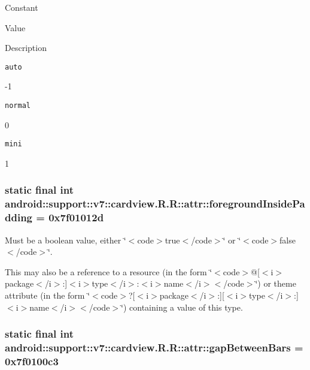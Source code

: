 Constant

Value

Description 

{\tt auto}

-1

{\tt normal}

0

{\tt mini}

1\hypertarget{classandroid_1_1support_1_1v7_1_1cardview_1_1_r_1_1attr_3a6ff577da785a4a52ea3ff7b5703961}{
\subsubsection[{foregroundInsidePadding}]{\setlength{\rightskip}{0pt plus 5cm}static final int android::support::v7::cardview.R.R::attr::foregroundInsidePadding = 0x7f01012d}}
\label{classandroid_1_1support_1_1v7_1_1cardview_1_1_r_1_1attr_3a6ff577da785a4a52ea3ff7b5703961}


Must be a boolean value, either \char`\"{}$<$code$>$true$<$/code$>$\char`\"{} or \char`\"{}$<$code$>$false$<$/code$>$\char`\"{}. 

This may also be a reference to a resource (in the form \char`\"{}$<$code$>$@\mbox{[}$<$i$>$package$<$/i$>$:\mbox{]}$<$i$>$type$<$/i$>$:$<$i$>$name$<$/i$>$$<$/code$>$\char`\"{}) or theme attribute (in the form \char`\"{}$<$code$>$?\mbox{[}$<$i$>$package$<$/i$>$:\mbox{]}\mbox{[}$<$i$>$type$<$/i$>$:\mbox{]}$<$i$>$name$<$/i$>$$<$/code$>$\char`\"{}) containing a value of this type. \hypertarget{classandroid_1_1support_1_1v7_1_1cardview_1_1_r_1_1attr_2d9396b152f09d179f895b9388bdcab4}{
\subsubsection[{gapBetweenBars}]{\setlength{\rightskip}{0pt plus 5cm}static final int android::support::v7::cardview.R.R::attr::gapBetweenBars = 0x7f0100c3}}
\label{classandroid_1_1support_1_1v7_1_1cardview_1_1_r_1_1attr_2d9396b152f09d179f895b9388bdcab4}


